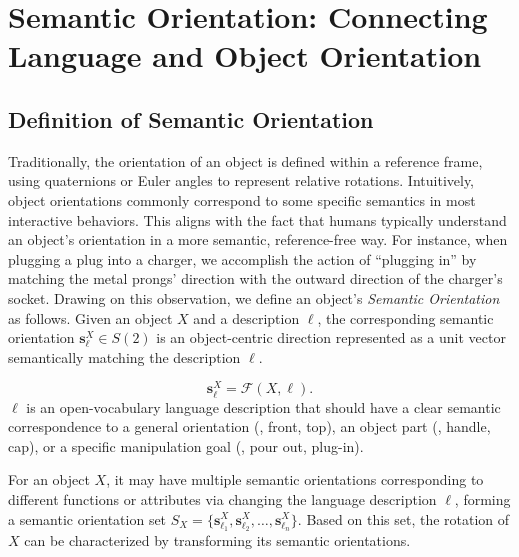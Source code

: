 \vspace{8pt}
\section{Semantic Orientation: Connecting Language and Object Orientation}
\subsection{Definition of Semantic Orientation}
Traditionally, the orientation of an object is defined within a reference frame, using quaternions or Euler angles to represent relative rotations. Intuitively, object orientations commonly correspond to some specific semantics in most interactive behaviors. This aligns with the fact that humans typically understand an object’s orientation in a more semantic, reference-free way. For instance, when plugging a plug into a charger, we accomplish the action of ``plugging in'' by matching the metal prongs’ direction with the outward direction of the charger’s socket.
Drawing on this observation, we define an object's \textit{Semantic Orientation} as follows.
Given an object $X$ and a description $\ell$, the corresponding semantic orientation $\mathbf{s}_{\ell}^X\in S(2)$ is an object-centric
direction represented as a unit vector semantically matching the description $\ell$.

\begin{equation}
    \mathbf{s}_{\ell}^X = \mathcal{F}(X, \ell). 
\end{equation}
$\ell$ is an open-vocabulary language description that should have a clear semantic correspondence to a general orientation (\eg, front, top), an object part (\eg, handle, cap), or a specific manipulation goal (\eg, pour out, plug-in).

For an object $X$, it may have multiple semantic orientations corresponding to different functions or attributes via changing the language description $\ell$, forming a semantic orientation set $ S_X = \{ \mathbf{s}_{\ell_1}^X, \mathbf{s}_{\ell_2}^X, \dots, \mathbf{s}_{\ell_n}^X \}$. Based on this set, the rotation of $X$ can be characterized by transforming its semantic orientations.

